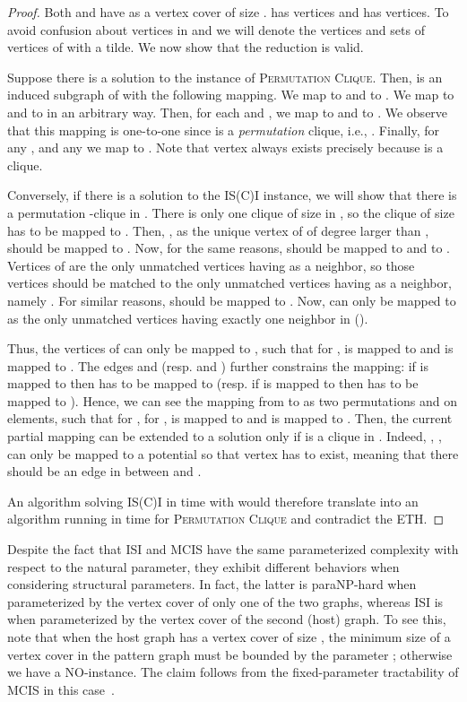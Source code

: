 \begin{proof}
Both  and  have  as a vertex cover of size 
.  has  vertices and  has 
 vertices.
To avoid confusion about vertices in  and  we will denote the 
vertices and sets of vertices of  with a tilde.
We now show that the reduction is valid.

Suppose there is a solution  to the instance of  \textsc{Permutation Clique}.
Then,  is an induced subgraph of  with the following mapping.
We map  to  and  to .
We map  to  and  to  in an arbitrary way.
Then, for each  and , we map  to  and  to .
We observe that this mapping is one-to-one since  is a \emph{permutation} clique, i.e., .
Finally, for any , and any  we map  to .
Note that vertex  always exists precisely because  is a clique.

Conversely, if there is a solution to the IS(C)I instance, we will show that there is a permutation -clique in .
There is only one clique of size  in , so the clique  of size  has to be mapped to .
Then, , as the unique vertex of  of degree larger than , should be mapped to .
Now, for the same reasons,  should be mapped to  and  to .
Vertices of  are the only  unmatched vertices having  as a neighbor, so those vertices should be matched to the only  unmatched vertices having  as a neighbor, namely .
For similar reasons,  should be mapped to .
Now,  can only be mapped to  as the only unmatched vertices having exactly one neighbor in  ().

Thus, the  vertices of  can only be mapped to , such that for ,  is mapped to  and  is mapped to .
The edges  and  (resp.  and ) further constrains the mapping: if  is mapped to  then  has to be mapped to  (resp. if  is mapped to  then  has to be mapped to ).
Hence, we can see the mapping from  to  as two permutations  and  on  elements, such that for , for ,  is mapped to  and  is mapped to .
Then, the current partial mapping can be extended to a solution only if  is a clique in .
Indeed, ,  ,  can only be mapped to a potential  so that vertex has to exist, meaning that there should be an edge in  between  and .

An algorithm solving IS(C)I in time  with  would therefore translate into an algorithm running in time  for  \textsc{Permutation Clique} and contradict the ETH.

\end{proof}

Despite the fact that ISI and MCIS have the same parameterized complexity with respect to the natural parameter, they exhibit different behaviors when considering structural parameters.
In fact, the latter is paraNP-hard when parameterized by the vertex cover of only one of the two graphs, whereas ISI is  when parameterized by the vertex cover of the second (host) graph.
To see this, note that when the host graph has a vertex cover of size , the minimum size of a vertex cover in the pattern graph must be bounded by the parameter ; otherwise we have a NO-instance.
The claim follows from the fixed-parameter tractability of MCIS in this case~\cite{AbuKhzam2014}.  









